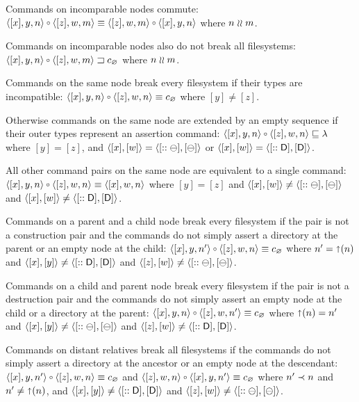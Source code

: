 \begin{mylem}
\begin{list}{\bf Rule~.}{}

\item[] %

\item{}
Commands on incomparable nodes commute:
$\cxynv\cc\czwmv \equiv \czwmv\cc\cxynv$ where $n\mathrel{\wr\wr} m$.

\item{}
Commands on incomparable nodes also do not break all filesystems:
$\wrksx{\cxynv\cc\czwmv}$ where $n\mathrel{\wr\wr} m$.

\item{}
Commands on the same node break every filesystem if their types are incompatible:
$\cxynv\cc\czwnv \equiv \cbrk$ where $[y]\ne [z]$.

\item{}
Otherwise commands on the same node are extended by an empty sequence if their outer types represent
an assertion command:
$\cxynv\cc\czwnv \eqext \emptyseq$ where $[y]=[z]$, and $\langle{[x],[w]}\rangle=\langle{[::\ominus],[\ominus]}\rangle$ 
or $\langle{[x],[w]}\rangle=\langle{[::\mathsf{D}],[\mathsf{D}]}\rangle$.

\item{}
All other command pairs on the same node are equivalent to a single command:
$\cxynv\cc \czwnv \equiv \cxwnv$ where $[y]=[z]$ and $\langle{[x],[w]}\rangle\neq\langle{[::\ominus],[\ominus]}\rangle$ and $\langle{[x],[w]}\rangle\neq\langle{[::\mathsf{D}],[\mathsf{D}]}\rangle$.


\item{}
Commands on a parent and a child node break every filesystem
if the pair is not a construction pair
and the commands do not simply assert a directory at the parent
or an empty node at the child:
$\cxynnv\cc\czwnv \equiv \cbrk$ where $n'=\mathord{\shortuparrow}(n)$ and $\langle{[x],[y]}\rangle\neq\langle{[::\mathsf{D}],[\mathsf{D}]}\rangle$ and $\langle{[z],[w]}\rangle\neq\langle{[::\ominus],[\ominus]}\rangle$.

\item{}
Commands on a child and parent node break every filesystem
if the pair is not a destruction pair
and the commands do not simply assert an empty node at the child
or a directory at the parent:
$\cxynv\cc\czwnnv \equiv \cbrk$ where $\mathord{\shortuparrow}(n)=n'$ and $\langle{[x],[y]}\rangle\neq\langle{[::\ominus],[\ominus]}\rangle$ and $\langle{[z],[w]}\rangle\neq\langle{[::\mathsf{D}],[\mathsf{D}]}\rangle$.

\item{}
Commands on distant relatives break all filesystems
if the commands do not simply assert a directory at the ancestor
or an empty node at the descendant:
$\cxynnv\cc\czwnv \equiv \cbrk$
and $\czwnv\cc\cxynnv \equiv\cbrk$
where $n'\prec n$ and $n'\neq\mathord{\shortuparrow}(n)$, and $\langle{[x],[y]}\rangle\neq\langle{[::\mathsf{D}],[\mathsf{D}]}\rangle$ and $\langle{[z],[w]}\rangle\neq\langle{[::\ominus],[\ominus]}\rangle$.


\end{list}
\end{mylem}
